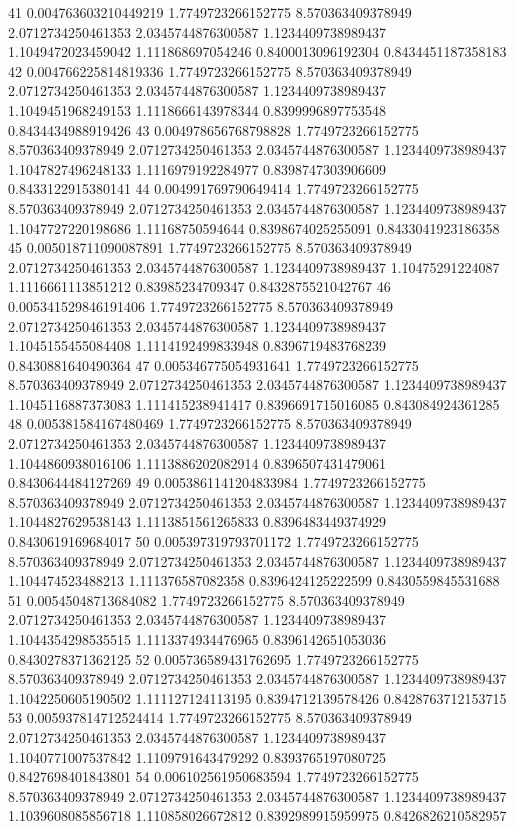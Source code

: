 {41 0.004763603210449219 1.7749723266152775 8.570363409378949 2.0712734250461353 2.0345744876300587 1.1234409738989437 1.1049472023459042 1.111868697054246 0.8400013096192304 0.8434451187358183
42 0.004766225814819336 1.7749723266152775 8.570363409378949 2.0712734250461353 2.0345744876300587 1.1234409738989437 1.1049451968249153 1.1118666143978344 0.8399996897753548 0.8434434988919426
43 0.004978656768798828 1.7749723266152775 8.570363409378949 2.0712734250461353 2.0345744876300587 1.1234409738989437 1.1047827496248133 1.1116979192284977 0.8398747303906609 0.8433122915380141
44 0.004991769790649414 1.7749723266152775 8.570363409378949 2.0712734250461353 2.0345744876300587 1.1234409738989437 1.1047727220198686 1.11168750594644 0.8398674025255091 0.8433041923186358
45 0.005018711090087891 1.7749723266152775 8.570363409378949 2.0712734250461353 2.0345744876300587 1.1234409738989437 1.10475291224087 1.1116661113851212 0.83985234709347 0.8432875521042767
46 0.005341529846191406 1.7749723266152775 8.570363409378949 2.0712734250461353 2.0345744876300587 1.1234409738989437 1.1045155455084408 1.1114192499833948 0.8396719483768239 0.8430881640490364
47 0.005346775054931641 1.7749723266152775 8.570363409378949 2.0712734250461353 2.0345744876300587 1.1234409738989437 1.1045116887373083 1.111415238941417 0.8396691715016085 0.843084924361285
48 0.005381584167480469 1.7749723266152775 8.570363409378949 2.0712734250461353 2.0345744876300587 1.1234409738989437 1.1044860938016106 1.1113886202082914 0.8396507431479061 0.8430644484127269
49 0.0053861141204833984 1.7749723266152775 8.570363409378949 2.0712734250461353 2.0345744876300587 1.1234409738989437 1.1044827629538143 1.1113851561265833 0.8396483449374929 0.8430619169684017
50 0.005397319793701172 1.7749723266152775 8.570363409378949 2.0712734250461353 2.0345744876300587 1.1234409738989437 1.104474523488213 1.111376587082358 0.8396424125222599 0.8430559845531688
51 0.00545048713684082 1.7749723266152775 8.570363409378949 2.0712734250461353 2.0345744876300587 1.1234409738989437 1.1044354298535515 1.1113374934476965 0.8396142651053036 0.8430278371362125
52 0.005736589431762695 1.7749723266152775 8.570363409378949 2.0712734250461353 2.0345744876300587 1.1234409738989437 1.1042250605190502 1.111127124113195 0.8394712139578426 0.8428763712153715
53 0.005937814712524414 1.7749723266152775 8.570363409378949 2.0712734250461353 2.0345744876300587 1.1234409738989437 1.1040771007537842 1.1109791643479292 0.8393765197080725 0.8427698401843801
54 0.006102561950683594 1.7749723266152775 8.570363409378949 2.0712734250461353 2.0345744876300587 1.1234409738989437 1.1039608085856718 1.110858026672812 0.8392989915959975 0.8426826210582957
}
